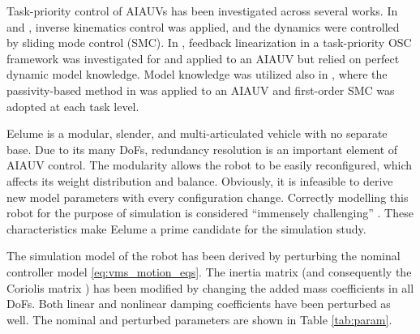 \documentclass[../main.tex]{subfiles}
\begin{document}
Task-priority control of AIAUVs has been investigated across several works. In \cite{Borlaug2022} and \cite{Iversflaten2022}, inverse kinematics control was applied, and the dynamics were controlled by sliding mode control (SMC). In \cite{Basso2020a}, feedback linearization in a task-priority OSC framework was investigated for and applied to an AIAUV but relied on perfect dynamic model knowledge. Model knowledge was utilized also in \cite{saebo2022}, where the passivity-based method in \cite{dietrich2020} was applied to an AIAUV and first-order SMC was adopted at each task level.

Eelume is a modular, slender, and multi-articulated vehicle with no separate base. Due to its many DoFs, redundancy resolution is an important element of AIAUV control. The modularity allows the robot to be easily reconfigured, which affects its weight distribution and balance. Obviously, it is infeasible to derive new model parameters with every configuration change. Correctly modelling this robot for the purpose of simulation is considered ``immensely challenging'' \citep{schmidt-didlaukies2018}. These characteristics make Eelume a prime candidate for the simulation study.

The simulation model of the robot has been derived by perturbing the nominal controller model \eqref{eq:vms_motion_eqs}. The inertia matrix (and consequently the Coriolis matrix \citep{Fossen2011}) has been modified by changing the added mass coefficients in all DoFs. Both linear and nonlinear damping coefficients have been perturbed as well. The nominal and perturbed parameters are shown in Table \ref{tab:param}.
\end{document}
